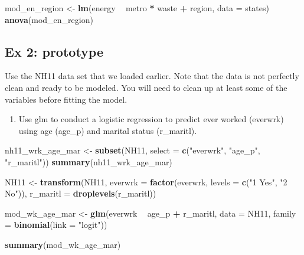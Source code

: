 \documentclass[]{book}
\newenvironment{Shaded}{\begin{snugshade}}{\end{snugshade}}
\newcommand{\KeywordTok}[1]{\textcolor[rgb]{0.13,0.29,0.53}{\textbf{#1}}}
\newcommand{\DataTypeTok}[1]{\textcolor[rgb]{0.13,0.29,0.53}{#1}}
\newcommand{\StringTok}[1]{\textcolor[rgb]{0.31,0.60,0.02}{#1}}
\newcommand{\OperatorTok}[1]{\textcolor[rgb]{0.81,0.36,0.00}{\textbf{#1}}}
\newcommand{\NormalTok}[1]{#1}
\providecommand{\tightlist}{%
  \setlength{\itemsep}{0pt}\setlength{\parskip}{0pt}}
\begin{document}
\begin{Shaded}
\begin{Highlighting}[]
\NormalTok{  mod_en_region <-}\StringTok{ }\KeywordTok{lm}\NormalTok{(energy }\OperatorTok{~}\StringTok{ }\NormalTok{metro }\OperatorTok{*}\StringTok{ }\NormalTok{waste }\OperatorTok{+}\StringTok{ }\NormalTok{region, }\DataTypeTok{data =}\NormalTok{ states)}
  \KeywordTok{anova}\NormalTok{(mod_en_region)}
\end{Highlighting}
\end{Shaded}

\subsection{Ex 2: prototype}\label{ex-2-prototype}

Use the NH11 data set that we loaded earlier. Note that the data is not
perfectly clean and ready to be modeled. You will need to clean up at
least some of the variables before fitting the model.

\begin{enumerate}
\def\labelenumi{\arabic{enumi}.}
\tightlist
\item
  Use glm to conduct a logistic regression to predict ever worked
  (everwrk) using age (age\_p) and marital status (r\_maritl).
\end{enumerate}

\begin{Shaded}
\begin{Highlighting}[]
\NormalTok{  nh11_wrk_age_mar <-}\StringTok{ }\KeywordTok{subset}\NormalTok{(NH11, }\DataTypeTok{select =} \KeywordTok{c}\NormalTok{(}\StringTok{"everwrk"}\NormalTok{, }\StringTok{"age_p"}\NormalTok{, }\StringTok{"r_maritl"}\NormalTok{))}
  \KeywordTok{summary}\NormalTok{(nh11_wrk_age_mar)}

\NormalTok{  NH11 <-}\StringTok{ }\KeywordTok{transform}\NormalTok{(NH11,}
                    \DataTypeTok{everwrk =} \KeywordTok{factor}\NormalTok{(everwrk, }\DataTypeTok{levels =} \KeywordTok{c}\NormalTok{(}\StringTok{"1 Yes"}\NormalTok{, }\StringTok{"2 No"}\NormalTok{)),}
                    \DataTypeTok{r_maritl =} \KeywordTok{droplevels}\NormalTok{(r_maritl))}

\NormalTok{  mod_wk_age_mar <-}\StringTok{ }\KeywordTok{glm}\NormalTok{(everwrk }\OperatorTok{~}\StringTok{ }\NormalTok{age_p }\OperatorTok{+}\StringTok{ }\NormalTok{r_maritl, }\DataTypeTok{data =}\NormalTok{ NH11,}
                        \DataTypeTok{family =} \KeywordTok{binomial}\NormalTok{(}\DataTypeTok{link =} \StringTok{"logit"}\NormalTok{))}

  \KeywordTok{summary}\NormalTok{(mod_wk_age_mar)}
\end{Highlighting}
\end{Shaded}
\end{document}
